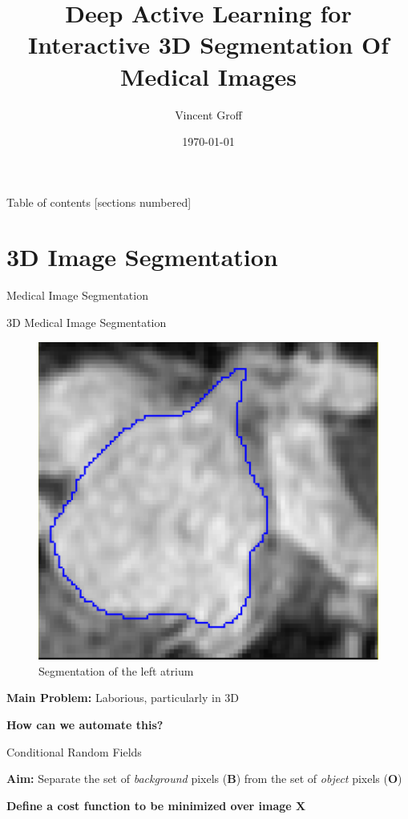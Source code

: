 \documentclass[10pt]{beamer}
\title{Deep Active Learning for Interactive 3D Segmentation Of Medical Images}
\date{\today}
\author{Vincent Groff}
\begin{document}
\maketitle

\begin{frame}{Table of contents}
  [sections numbered]
  \tableofcontents[hideallsubsections]
\end{frame}


\section{3D Image Segmentation}

\begin{frame}[fragile]{Medical Image Segmentation}

    \begin{block}{3D Medical Image Segmentation}
    \end{block}
    
    \begin{figure}[h!]
    \centering
    \includegraphics[scale=0.20]{pictures/seg}
    \caption{Segmentation of the left atrium}
    \label{fig:heartSegTruth}
    \end{figure}
        
    \textbf{Main Problem:} Laborious, particularly in 3D
    \pause
    
    \textbf{How can we automate this?}
\end{frame}


\begin{frame}[fragile]{Conditional Random Fields}

    \textbf{Aim:} Separate the set of \textit{background} pixels (\textbf{B}) from the set of \textit{object} pixels (\textbf{O})
  
    \textbf{Define a cost function to be minimized over image $\mathbf{X}$}
\end{frame}
\end{document}
